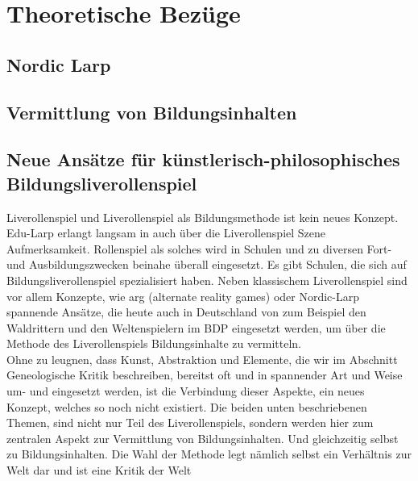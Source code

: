 \documentclass[a4paper, 12pt]{scrartcl}
\begin{document}
    \section{Theoretische Bezüge}
    \subsection{Nordic Larp} \label{nordic-larp}
    \subsection{Vermittlung von Bildungsinhalten}

    \subsection{Neue Ansätze für künstlerisch-philosophisches Bildungsliverollenspiel}
    Liverollenspiel und Liverollenspiel als Bildungsmethode ist kein neues Konzept. 
    Edu-Larp erlangt langsam in auch über die Liverollenspiel Szene Aufmerksamkeit. 
    Rollenspiel als solches wird in Schulen und zu diversen Fort- und Ausbildungszwecken beinahe überall eingesetzt. 
    Es gibt Schulen, die sich auf Bildungsliverollenspiel spezialisiert haben.
    Neben klassischem Liverollenspiel sind vor allem Konzepte, wie arg (alternate reality games) oder Nordic-Larp spannende Ansätze, die heute auch in Deutschland von zum Beispiel den Waldrittern und den Weltenspielern im BDP eingesetzt werden, um über die Methode des Liverollenspiels Bildungsinhalte zu vermitteln. \\
    Ohne zu leugnen, dass Kunst, Abstraktion und Elemente, die wir im Abschnitt \glqq Geneologische Kritik\grqq{} beschreiben, bereitst oft und in spannender Art und Weise um- und eingesetzt werden, ist die Verbindung dieser Aspekte, ein neues Konzept, welches so noch nicht existiert.
    Die beiden unten beschriebenen Themen, sind nicht nur Teil des Liverollenspiels, sondern werden hier zum zentralen Aspekt zur Vermittlung von Bildungsinhalten.
    Und gleichzeitig selbst zu Bildungsinhalten. 
    Die Wahl der Methode legt nämlich selbst ein Verhältnis zur Welt dar und ist eine Kritik der Welt 
\end{document}
